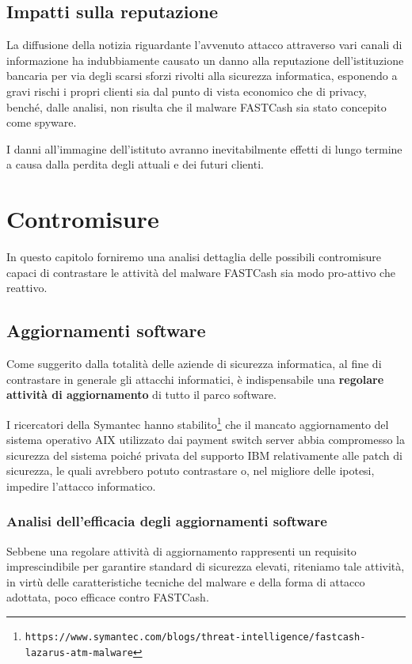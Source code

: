 \documentclass[10pt,a4paper, titlepage]{report}
\begin{document}
\section{Impatti sulla reputazione}

La diffusione della notizia riguardante l'avvenuto attacco attraverso vari canali di informazione ha indubbiamente causato un danno alla reputazione dell'istituzione bancaria per via degli scarsi sforzi rivolti alla sicurezza informatica, esponendo a gravi rischi i propri clienti sia dal punto di vista economico che di privacy, benché, dalle analisi, non risulta che il malware FASTCash sia stato concepito come spyware.

I danni all'immagine dell'istituto avranno inevitabilmente effetti di lungo termine a causa dalla perdita degli attuali e dei futuri clienti.

\newpage
\chapter{Contromisure}

In questo capitolo forniremo una analisi dettaglia delle possibili contromisure capaci di contrastare le attività del malware FASTCash sia modo pro-attivo che reattivo.

\section{Aggiornamenti software}

Come suggerito dalla totalità delle aziende di sicurezza informatica, al fine di contrastare in generale gli attacchi informatici, è indispensabile una \textbf{regolare attività di aggiornamento} di tutto il parco software.

I ricercatori della Symantec hanno stabilito\footnote{\texttt{https://www.symantec.com/blogs/threat-intelligence/fastcash-lazarus-atm-malware}} che il mancato aggiornamento del sistema operativo AIX utilizzato dai payment switch server abbia compromesso la sicurezza del sistema poiché privata del supporto IBM relativamente alle patch di sicurezza, le quali avrebbero potuto contrastare o, nel migliore delle ipotesi, impedire l'attacco informatico. 

\subsection{Analisi dell'efficacia degli aggiornamenti software}

Sebbene una regolare attività di aggiornamento rappresenti un requisito imprescindibile per garantire standard di sicurezza elevati, riteniamo tale attività, in virtù delle caratteristiche tecniche del malware e della forma di attacco adottata, poco efficace contro FASTCash.
 
\end{document}
